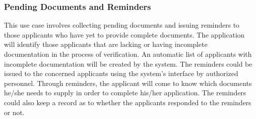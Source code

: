 \subsubsection{Pending Documents and Reminders}

This use case involves collecting pending documents and issuing reminders to those applicants who have yet to provide complete documents.
The application will identify those applicants that are lacking or having incomplete documentation in the process of verification. 
An automatic list of applicants with incomplete documentation will be created by the system.
The reminders could be issued to the concerned applicants using the system’s interface by authorized personnel. 
Through reminders, the applicant will come to know which documents he/she needs to supply in order to complete his/her application. 
The reminders could also keep a record as to whether the applicants responded to the reminders or not.

